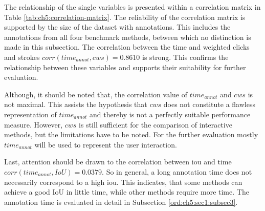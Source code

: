 The relationship of the single variables is presented within a correlation matrix in Table \ref{tab:ch5:correlation-matrix}.
The reliability of the correlation matrix is supported by the size of the dataset with \getNumberBenchmarkAnnotations annotations.
This includes the annotations from all four benchmark methods, between which no distinction is made in this subsection.
The correlation between the time and weighted clicks and strokes $ corr \left(time_{annot}, cws \right) = 0.8610 $ is strong.
This confirms the relationship between these variables and supports their suitability for further evaluation.

Although, it should be noted that, the correlation value of $ time_{annot} $ and $ cws $ is not maximal.
This assists the hypothesis that $ cws $ does not constitute a flawless representation of $ time_{annot} $ and thereby is not a perfectly suitable performance measure.
However, $ cws $ is still sufficient for the comparison of interactive methods, but the limitations have to be noted.
For the further evaluation mostly $ time_{annot} $ will be used to represent the user interaction.

Last, attention should be drawn to the correlation between \gls{iou} and time \linebreak $ corr \left(time_{annot}, IoU \right) = 0.0379 $.
So in general, a long annotation time does not necessarily correspond to a high \gls{iou}.
This indicates, that some methods can achieve a good IoU in little time, while other methods require more time.
The annotation time is evaluated in detail in Subsection \ref{ord:ch5:sec1:subsec3}. 

